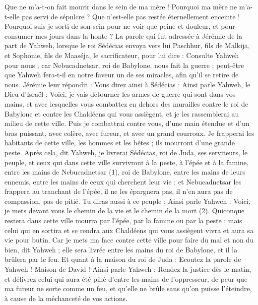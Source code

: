 \begin{multicols}{2}
Que ne m’a-t-on fait mourir dans le sein de ma mère ! Pourquoi ma mère ne m’a-t-elle pas servi de sépulcre ? Que n’est-elle pas restée éternellement enceinte !
Pourquoi suis-je sorti de son sein pour ne voir que peine et douleur, et pour consumer mes jours dans la honte ?
\VerseOne{}La parole qui fut adressée à Jérémie de la part de Yahweh, lorsque le roi Sédécias envoya vers lui Paschhur, fils de Malkija, et Sophonie, fils de Maaséja, le sacrificateur, pour lui dire :
Consulte Yahweh pour nous ; car Nebucadnetsar, roi de Babylone, nous fait la guerre ; peut-être que Yahweh fera-t-il en notre faveur un de ses miracles, afin qu’il se retire de nous.
Jérémie leur répondit : Vous direz ainsi à Sédécias :
Ainsi parle Yahweh, le Dieu d'Israël : Voici, je vais détourner les armes de guerre qui sont dans vos mains, et avec lesquelles vous combattez en dehors des murailles contre le roi de Babylone et contre les Chaldéens qui vous assiègent, et je les rassemblerai au milieu de cette ville.
Puis je combattrai contre vous, d’une main étendue et d’un bras puissant, avec colère, avec fureur, et avec un grand courroux.
Je frapperai les habitants de cette ville, les hommes et les bêtes ; ils mourront d'une grande peste.
Après cela, dit Yahweh, je livrerai Sédécias, roi de Juda, ses serviteurs, le peuple, et ceux qui dans cette ville survivront à la peste, à l'épée et à la famine, entre les mains de Nebucadnetsar\FTNT{} (1), roi de Babylone, entre les mains de leurs ennemis, entre les mains de ceux qui cherchent leur vie ; et Nebucadnetsar les frappera au tranchant de l'épée, il ne les épargnera pas, il n'en aura pas de compassion, pas de pitié.
Tu diras aussi à ce peuple : Ainsi parle Yahweh : Voici, je mets devant vous le chemin de la vie et le chemin de la mort\FTNT{} (2).
Quiconque restera dans cette ville mourra par l'épée, par la famine ou par la peste ; mais celui qui en sortira et se rendra aux Chaldéens qui vous assiègent vivra et aura sa vie pour butin.
Car je mets ma face contre cette ville pour faire du mal et non du bien, dit Yahweh ; elle sera livrée entre les mains du roi de Babylone, et il la brûlera par le feu.
Et quant à la maison du roi de Juda : Ecoutez la parole de Yahweh !
Maison de David ! Ainsi parle Yahweh : Rendez la justice dès le matin, et délivrez celui qui aura été pillé d'entre les mains de l’oppresseur, de peur que ma fureur ne sorte comme un feu, et qu'elle ne brûle sans qu’on puisse l’éteindre, à cause de la méchanceté de vos actions.

\end{multicols}
